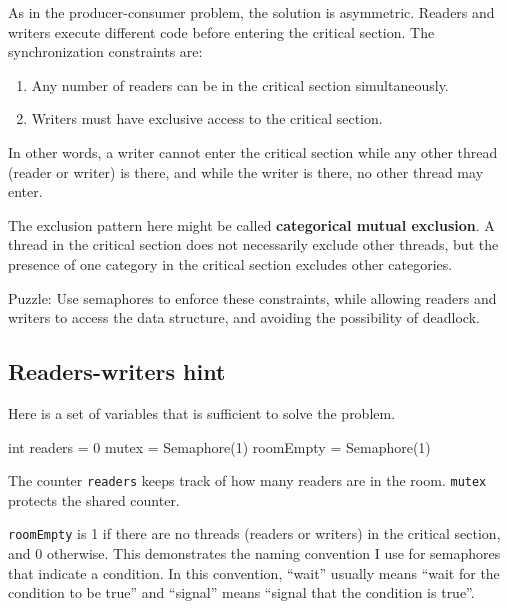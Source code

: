 \documentclass{book}
\begin{document}
As in the producer-consumer problem, the solution is asymmetric.
Readers and writers execute different code before entering the
critical section.  The synchronization constraints are:

\begin{enumerate}

    \item Any number of readers can be in the critical section
          simultaneously.

    \item Writers must have exclusive access to the critical section.

\end{enumerate}

In other words, a writer cannot enter the critical section while
any other thread (reader or writer) is there, and while the writer
is there, no other thread may enter.

The exclusion pattern here might be called {\bf categorical
        mutual exclusion}.  A thread in the critical section
does not necessarily exclude other threads, but the presence
of one category in the critical section excludes other
categories.

Puzzle: Use semaphores to enforce these constraints, while allowing
readers and writers to access the data structure, and avoiding
the possibility of deadlock.



\subsection{Readers-writers hint}

Here is a set of variables that is sufficient to solve the
problem.


\begin{unbreakable}[title={Readers-writers initialization}]{}
int readers = 0
mutex = Semaphore(1)
roomEmpty = Semaphore(1)
\end{unbreakable}

The counter {\tt readers} keeps track of how many readers are in the room.  {\tt mutex} protects the shared counter.

{\tt roomEmpty} is 1 if there are no threads (readers or writers) in the critical section, and 0 otherwise.  This demonstrates the naming convention I use for semaphores that indicate a condition.  In this convention, ``wait'' usually means ``wait for the condition to be true'' and ``signal'' means ``signal that the condition is true''.
\end{document}
